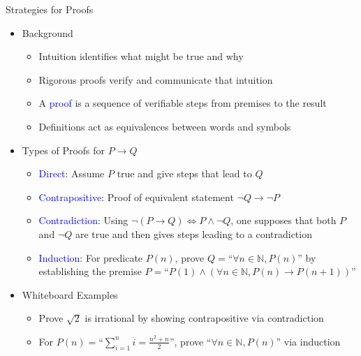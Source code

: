 \documentclass[10pt,english]{beamer}
\begin{document}
\begin{frame}{Strategies for Proofs}

\begin{itemize}
\setlength\itemsep{3mm}
\item<1-> Background
\begin{itemize} 
 \setlength\itemsep{1.5mm}
 \item Intuition identifies what might be true and why
 \item Rigorous proofs verify and communicate that intuition
 \item A \textcolor{blue}{proof} is a sequence of verifiable steps from premises to the result
 \item Definitions act as equivalences between words and symbols 
\end{itemize}

\item<2-> Types of Proofs for $P \rightarrow Q$
\begin{itemize} 
 \setlength\itemsep{1.5mm}
 \item \textcolor{blue}{Direct}: Assume $P$ true and give steps that lead to $Q$
 \item \textcolor{blue}{Contrapositive}: Proof of equivalent statement $\neg Q \rightarrow \neg P$
 \item \textcolor{blue}{Contradiction}: Using $\neg (P \rightarrow Q) \Leftrightarrow P \wedge \neg Q$, one supposes that both $P$ and $\neg Q$ are true and then gives steps leading to a contradiction
 \item \textcolor{blue}{Induction}: For predicate $P(n)$, prove $Q=$``$\forall n\in\mathbb{N}, P(n)$'' by establishing the premise $P=$``$P(1) \wedge (\forall n\in \mathbb{N}, P(n) \rightarrow P(n\!+\!1))$''
\end{itemize}

\item<3-> Whiteboard Examples \vspace{1mm}
\begin{itemize} 
 \setlength\itemsep{1.5mm}
 \item Prove $\sqrt{2}$ is irrational by showing contrapositive via contradiction
 \item For $P(n)=$``$\sum_{i=1}^n i = \frac{n^2 + n}{2}$'', prove ``$\forall n\in \mathbb{N}, P(n)$'' via induction
\end{itemize}
\end{itemize}

\end{frame} 
\end{document}
